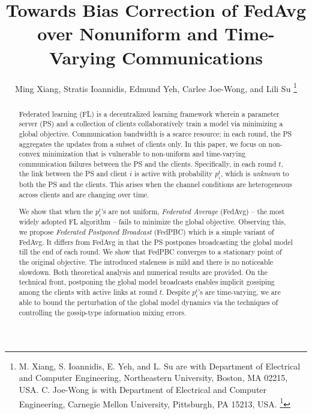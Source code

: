 \documentclass[letterpaper, 10 pt, conference]{ieeeconf}  %
\title{\LARGE \bf
Towards Bias Correction of FedAvg over Nonuniform and Time-Varying Communications
}
\author{Ming Xiang, Stratis Ioannidis, Edmund Yeh, Carlee Joe-Wong, and Lili Su%
\thanks{M. Xiang, S. Ioannidis, E. Yeh, and L. Su are with Department of Electrical and Computer Engineering, Northeastern University,
    Boston, MA 02215, USA. 
    C. Joe-Wong is with Department of Electrical and Computer Engineering, Carnegie Mellon University, Pittsburgh, PA 15213, USA. 
\thanks{There is a typo in Lemma \ref{lemma: local step perturbation} of the short version, we have corrected it in this full version.}  
}
}
\begin{document}
\maketitle
\thispagestyle{empty}
\pagestyle{empty}


\begin{abstract}
Federated learning (FL) is a decentralized learning framework wherein a parameter server (PS) and a collection of clients collaboratively train a model via minimizing a global objective. %
Communication bandwidth is a scarce resource; in each round, the PS aggregates the updates from a subset of clients only.  
In this paper, we focus on non-convex minimization that is vulnerable to non-uniform and  time-varying communication failures between the PS and the clients. 
Specifically, in each round $t$, the link between the PS and client $i$ is active with probability $p_i^t$, which is {\em unknown} to both the PS and the clients. 
This arises when %
the channel conditions are heterogeneous across clients and are changing over time.  

We show that when the $p_i^t$'s are not uniform, %
{\em Federated Average} (FedAvg) -- the most widely adopted FL algorithm -- fails to minimize the global objective. Observing this, we propose {\em Federated Postponed Broadcast} (FedPBC) which is a simple variant of FedAvg. It differs from FedAvg in that the PS postpones broadcasting the global model till the end of each round.  
We show that FedPBC converges to a stationary point of the original objective. %
The introduced staleness is mild and there is no noticeable slowdown. Both theoretical analysis and numerical results are provided. 
On the technical front, %
postponing the global model broadcasts enables implicit gossiping among the clients with active links at round $t$. 
Despite $p_i^t$'s are time-varying, %
we are able to bound the perturbation of the global model dynamics %
via the techniques of controlling the gossip-type information mixing errors. %
\end{abstract}
\end{document}
